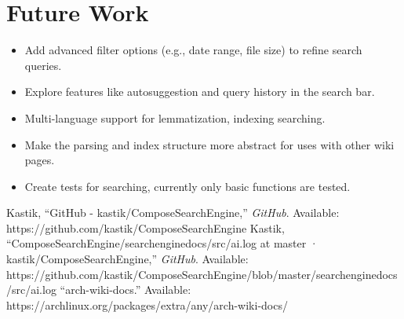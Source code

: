 \documentclass[conference]{IEEEtran}
\begin{document}
    \section{Future Work}{
    \begin{itemize}
        \item Add advanced filter options (e.g., date range, file size) to refine search queries.
        \item Explore features like autosuggestion and query history in the search bar.
        \item Multi-language support for lemmatization, indexing searching.
        \item Make the parsing and index structure more abstract for uses with other wiki pages.
        \item Create tests for searching, currently only basic functions are tested.
    \end{itemize}
    }

    \begin{thebibliography}{00}
         Kastik, “GitHub - kastik/ComposeSearchEngine,” \textit{GitHub}. Available: https://github.com/kastik/ComposeSearchEngine
         Kastik, “ComposeSearchEngine/searchenginedocs/src/ai.log at master · kastik/ComposeSearchEngine,” \textit{GitHub}. Available: https://github.com/kastik/ComposeSearchEngine/blob/master/searchenginedocs/src/ai.log
         “arch-wiki-docs.” Available: https://archlinux.org/packages/extra/any/arch-wiki-docs/
    \end{thebibliography}
    \vspace{12pt}
\end{document}
